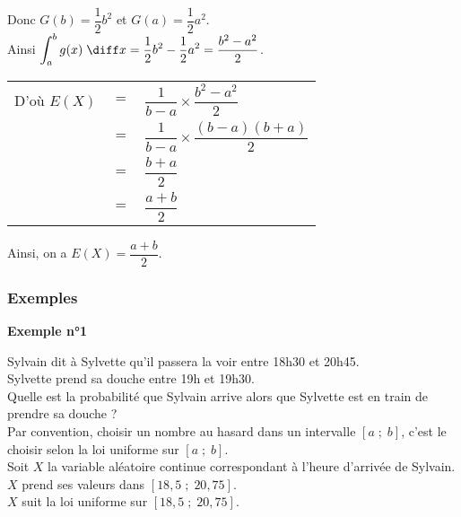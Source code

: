Donc $G\left(b\right) = \dfrac{1}{2}b^2$ et $G\left(a\right) = \dfrac{1}{2}a^2$. \\

Ainsi $\displaystyle{\int_a^b g(x) \; \diff x} = \dfrac{1}{2}b^2 - \dfrac{1}{2}a^2 = \dfrac{b^2 - a^2}{2}$. \\

\vspace*{.3cm}

\begin{tabular}{lll}
\hspace{-.3cm} D'où $E\left(X\right)$ & $=$ & $\dfrac{1}{b-a} \times \dfrac{b^2 - a^2}{2}$ \vspace*{.3cm} \\
& $=$ & $\dfrac{1}{b-a} \times \dfrac{\left(b-a\right)\left(b+a\right)}{2}$ \vspace*{.3cm} \\
& $=$ & $\dfrac{b+a}{2}$ \vspace*{.3cm} \\
& $=$ & $\dfrac{a+b}{2}$ \\
\end{tabular}

\vspace*{.3cm}

Ainsi, on a $E\left(X\right) = \dfrac{a+b}{2}$.

\newpage

\vspace*{-2cm}

\subsubsection{Exemples}

\textbf{Exemple n°1} 

Sylvain dit à Sylvette qu'il passera la voir entre 18h30 et 20h45. \\
Sylvette prend sa douche entre 19h et 19h30. \\

Quelle est la probabilité que Sylvain arrive alors que Sylvette est en train de prendre sa douche ? \\

Par convention, choisir un nombre au hasard dans un intervalle $\left[a \; ; \; b\right]$, c'est le choisir selon la loi uniforme sur $\left[a \; ; \; b\right]$. \\

Soit $X$ la variable aléatoire continue correspondant à l'heure d'arrivée de Sylvain. \\
$X$ prend ses valeurs dans $\left[18,5 \; ; \; 20,75\right]$. \\
$X$ suit la loi uniforme sur $\left[18,5 \; ; \; 20,75\right]$. \\

